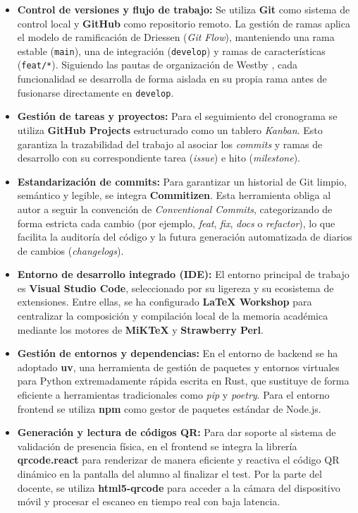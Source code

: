 \begin{itemize}
    \item \textbf{Control de versiones y flujo de trabajo:} Se utiliza \textbf{Git} como sistema de control local y \textbf{GitHub} como repositorio remoto. La gestión de ramas aplica el modelo de ramificación de Driessen \cite{driessen2010git} (\textit{Git Flow}), manteniendo una rama estable (\texttt{main}), una de integración (\texttt{develop}) y ramas de características (\texttt{feat/*}). Siguiendo las pautas de organización de Westby \cite{westby2015git}, cada funcionalidad se desarrolla de forma aislada en su propia rama antes de fusionarse directamente en \texttt{develop}.
    \item \textbf{Gestión de tareas y proyectos:} Para el seguimiento del cronograma se utiliza \textbf{GitHub Projects} estructurado como un tablero \textit{Kanban}. Esto garantiza la trazabilidad del trabajo al asociar los \textit{commits} y ramas de desarrollo con su correspondiente tarea (\textit{issue}) e hito (\textit{milestone}).
    \item \textbf{Estandarización de commits:} Para garantizar un historial de Git limpio, semántico y legible, se integra \textbf{Commitizen}. Esta herramienta obliga al autor a seguir la convención de \textit{Conventional Commits}, categorizando de forma estricta cada cambio (por ejemplo, \textit{feat}, \textit{fix}, \textit{docs} o \textit{refactor}), lo que facilita la auditoría del código y la futura generación automatizada de diarios de cambios (\textit{changelogs}).
    \item \textbf{Entorno de desarrollo integrado (IDE):} El entorno principal de trabajo es \textbf{Visual Studio Code}, seleccionado por su ligereza y su ecosistema de extensiones. Entre ellas, se ha configurado \textbf{LaTeX Workshop} para centralizar la composición y compilación local de la memoria académica mediante los motores de \textbf{MiKTeX} y \textbf{Strawberry Perl}.
    \item \textbf{Gestión de entornos y dependencias:} En el entorno de backend se ha adoptado \textbf{uv}, una herramienta de gestión de paquetes y entornos virtuales para Python extremadamente rápida escrita en Rust, que sustituye de forma eficiente a herramientas tradicionales como \textit{pip} y \textit{poetry}. Para el entorno frontend se utiliza \textbf{npm} como gestor de paquetes estándar de Node.js.
    \item \textbf{Generación y lectura de códigos QR:} Para dar soporte al sistema de validación de presencia física, en el frontend se integra la librería \textbf{qrcode.react} para renderizar de manera eficiente y reactiva el código QR dinámico en la pantalla del alumno al finalizar el test. Por la parte del docente, se utiliza \textbf{html5-qrcode} para acceder a la cámara del dispositivo móvil y procesar el escaneo en tiempo real con baja latencia.

\end{itemize}
